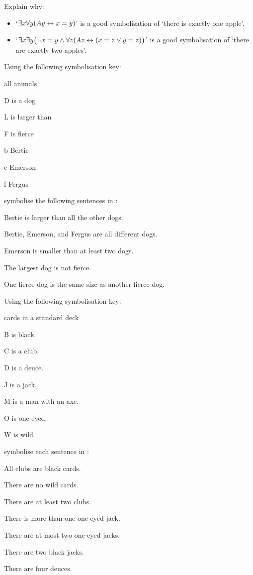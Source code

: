 \problempart Explain why:
\begin{itemize}
\item   `$\exists x \forall y(Ay \leftrightarrow x= y)$' is a good symbolisation of `there is exactly one apple'.
\item `$\exists x \exists y \bigl(\neg x = y \wedge \forall z(Az \leftrightarrow (x= z \vee y = z) \bigr)$' is a good symbolisation of `there are exactly two apples'.
\end{itemize}

\problempart Using the following symbolisation key:
\begin{ekey}
\item[\text{domain}] all animals
\item[D]  is a dog
\item[L]  is larger than 
\item[F]  is fierce
\item[b] Bertie
\item[e] Emerson
\item[f] Fergus
\end{ekey}
symbolise the following sentences in \FOL:
\begin{earg}
\item Bertie is larger than all the other dogs.
\item Bertie, Emerson, and Fergus are all different dogs.
\item Emerson is smaller than at least two dogs.
\item The largest dog is not fierce.
\item One fierce dog is the same size as another fierce dog.
\end{earg}

\problempart
\label{pr.FOLcardsa}
Using the following symbolisation key:
\begin{ekey}
\item[\text{domain}] cards in a standard deck
\item[B]  is black.
\item[C]  is a club.
\item[D]  is a deuce.
\item[J]  is a jack.
\item[M]  is a man with an axe.
\item[O]  is one-eyed.
\item[W]  is wild.
\end{ekey}
symbolise each sentence in \FOL:
\begin{earg}
\item All clubs are black cards.
\item There are no wild cards.
\item There are at least two clubs.
\item There is more than one one-eyed jack.
\item There are at most two one-eyed jacks.
\item There are two black jacks.
\item There are four deuces.
\end{earg}

